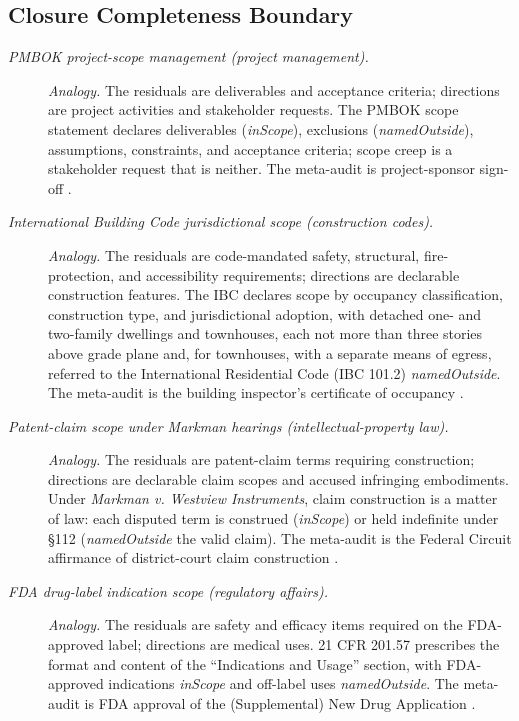 \subsection*{ Closure Completeness Boundary}
\begingroup\small
\begin{description}
\item[\emph{{PMBOK} project-scope management
(project management).}] \textit{Analogy.}
The residuals are deliverables and acceptance
criteria; directions are project activities and
stakeholder requests.  The PMBOK scope statement
declares deliverables (\emph{inScope}), exclusions
(\emph{namedOutside}), assumptions, constraints,
and acceptance criteria; scope creep is a
stakeholder request that is neither.  The
meta-audit is project-sponsor sign-off
\citep{PMI2017PMBOK}.

\item[\emph{International Building Code
jurisdictional scope (construction codes).}] \textit{Analogy.}
The residuals are code-mandated safety,
structural, fire-protection, and accessibility
requirements; directions are declarable
construction features.  The IBC declares scope by
occupancy classification, construction type, and
jurisdictional adoption, with detached one- and two-family dwellings and townhouses, each not more than three stories above grade plane and, for townhouses, with a separate means of egress, referred to the International Residential Code (IBC 101.2) \emph{namedOutside}.  The meta-audit is the
building inspector's certificate of occupancy
\citep{ICC2021IBC}.

\item[\emph{Patent-claim scope under {M}arkman
hearings (intellectual-property law).}] \textit{Analogy.}
The residuals are patent-claim terms requiring
construction; directions are declarable claim
scopes and accused infringing embodiments.  Under
\emph{Markman v. Westview Instruments}, claim
construction is a matter of law: each disputed term
is construed (\emph{inScope}) or held indefinite
under \S112 (\emph{namedOutside} the valid claim).
The meta-audit is the Federal Circuit affirmance of
district-court claim construction
\citep{Markman1996Westview}.

\item[\emph{{FDA} drug-label indication scope
(regulatory affairs).}] \textit{Analogy.}
The residuals are safety and efficacy items required
on the FDA-approved label; directions are medical
uses.  21 CFR 201.57 prescribes the format and
content of the ``Indications and Usage'' section,
with FDA-approved indications \emph{inScope} and
off-label uses \emph{namedOutside}.  The meta-audit
is FDA approval of the (Supplemental) New Drug
Application \citep{FDA21CFR20157}.
\end{description}
\endgroup

